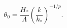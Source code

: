 \begin{equation}\label{eq:theta-l}
  \theta_0=\frac{H_*}{\Lambda}\left(\frac{k}{k_*}\right)^{-1/p}.
\end{equation}

